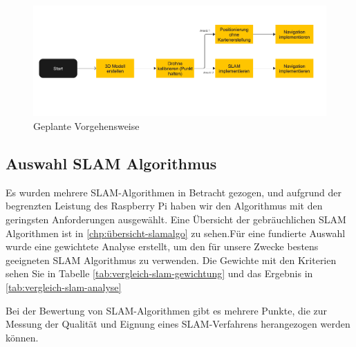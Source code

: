 \begin{figure}
    \includegraphics[scale=0.7]{images/ansatz_plan.pdf}
    \caption{Geplante Vorgehensweise}\label{fig:vorgehensweise}
\end{figure}

\subsection{Auswahl SLAM Algorithmus}

Es wurden mehrere \ac{SLAM}-Algorithmen in Betracht gezogen, und aufgrund der begrenzten Leistung des Raspberry Pi haben wir den Algorithmus mit den geringsten Anforderungen ausgewählt. Eine Übersicht der gebräuchlichen \ac{SLAM} Algorithmen ist in \ref{chp:übersicht-slamalgo} zu sehen.Für eine fundierte Auswahl wurde eine gewichtete Analyse erstellt, um den für unsere Zwecke bestens geeigneten \ac{SLAM} Algorithmus zu verwenden. Die Gewichte mit den Kriterien sehen Sie in Tabelle \ref{tab:vergleich-slam-gewichtung} und das Ergebnis in \ref{tab:vergleich-slam-analyse}

Bei der Bewertung von SLAM-Algorithmen gibt es mehrere Punkte, die zur Messung der Qualität und Eignung eines SLAM-Verfahrens herangezogen werden können.

